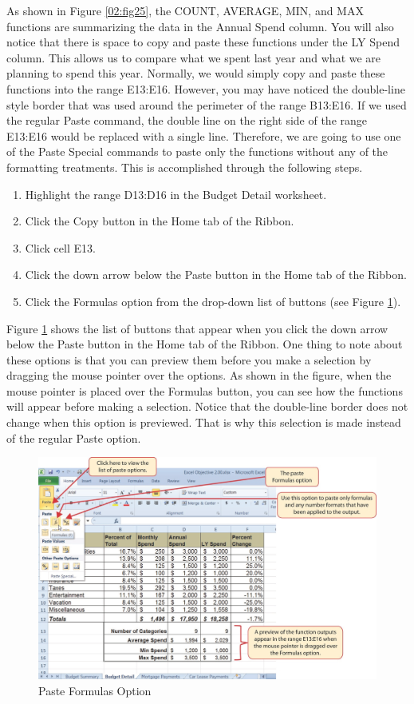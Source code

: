 As shown in Figure \ref{02:fig25}, the COUNT, AVERAGE, MIN, and MAX functions are summarizing the data in the Annual Spend column. You will also notice that there is space to copy and paste these functions under the LY Spend column. This allows us to compare what we spent last year and what we are planning to spend this year. Normally, we would simply copy and paste these functions into the range \textsf{E13:E16}. However, you may have noticed the double-line style border that was used around the perimeter of the range \textsf{B13:E16}. If we used the regular Paste command, the double line on the right side of the range \textsf{E13:E16} would be replaced with a single line. Therefore, we are going to use one of the Paste Special commands to paste only the functions without any of the formatting treatments. This is accomplished through the following steps.

\begin{enumerate}
	\item Highlight the range D13:D16 in the Budget Detail worksheet.
\item Click the Copy button in the Home tab of the Ribbon.
\item Click cell E13.
\item Click the down arrow below the Paste button in the Home tab of the Ribbon.
\item Click the Formulas option from the drop-down list of buttons (see Figure \ref{02:fig26}).
\end{enumerate}

Figure \ref{02:fig26} shows the list of buttons that appear when you click the down arrow below the Paste button in the Home tab of the Ribbon. One thing to note about these options is that you can preview them before you make a selection by dragging the mouse pointer over the options. As shown in the figure, when the mouse pointer is placed over the Formulas button, you can see how the functions will appear before making a selection. Notice that the double-line border does not change when this option is previewed. That is why this selection is made instead of the regular Paste option.

\begin{figure}[H]
	\centering
	\includegraphics[width=\maxwidth{.95\linewidth}]{gfx/ch02_fig26}
	\caption{Paste Formulas Option}
	\label{02:fig26}
\end{figure}

